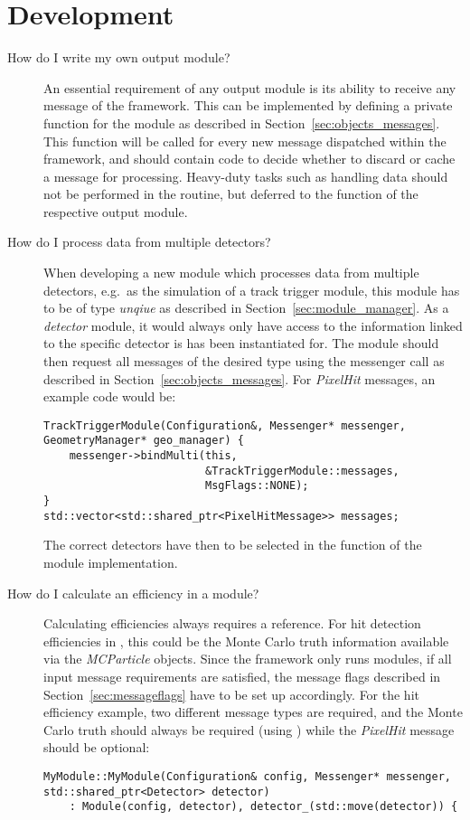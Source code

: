 \section{Development}
\begin{description}
\item[How do I write my own output module?]
An essential requirement of any output module is its ability to receive any message of the framework.
This can be implemented by defining a private  function for the module as described in Section~\ref{sec:objects_messages}.
This function will be called for every new message dispatched within the framework, and should contain code to decide whether to discard or cache a message for processing.
Heavy-duty tasks such as handling data should not be performed in the  routine, but deferred to the  function of the respective output module.

\item[How do I process data from multiple detectors?]
When developing a new \apsq module which processes data from multiple detectors, e.g.\ as the simulation of a track trigger module, this module has to be of type \emph{unqiue} as described in Section~\ref{sec:module_manager}.
As a \emph{detector} module, it would always only have access to the information linked to the specific detector is has been instantiated for.
The module should then request all messages of the desired type using the messenger call  as described in Section~\ref{sec:objects_messages}.
For \emph{PixelHit} messages, an example code would be:

\begin{verbatim}
TrackTriggerModule(Configuration&, Messenger* messenger, GeometryManager* geo_manager) {
    messenger->bindMulti(this,
                         &TrackTriggerModule::messages,
                         MsgFlags::NONE);
}
std::vector<std::shared_ptr<PixelHitMessage>> messages;
\end{verbatim}
The correct detectors have then to be selected in the  function of the module implementation.
\item[How do I calculate an efficiency in a module?]
Calculating efficiencies always requires a reference.
For hit detection efficiencies in \apsq, this could be the Monte Carlo truth information available via the \emph{MCParticle} objects.
Since the framework only runs modules, if all input message requirements are satisfied, the message flags described in Section~\ref{sec:messageflags} have to be set up accordingly.
For the hit efficiency example, two different message types are required, and the Monte Carlo truth should always be required (using ) while the \emph{PixelHit} message should be optional:
\begin{verbatim}
MyModule::MyModule(Configuration& config, Messenger* messenger, std::shared_ptr<Detector> detector)
    : Module(config, detector), detector_(std::move(detector)) {


\end{verbatim}
\end{description}
